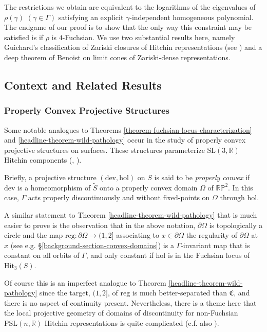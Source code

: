 \documentclass[12pt,a4paper]{amsart}
\theoremstyle{definition}
\theoremstyle{plain}
\numberwithin{equation}{section}
\begin{document}
The restrictions we obtain are equivalent to the logarithms of the eigenvalues of $\rho(\gamma)$ $(\gamma \in \Gamma)$ satisfying an explicit $\gamma$-independent homogeneous polynomial. The endgame of our proof is to show that the only way this constraint may be satisfied is if $\rho$ is $4$-Fuchsian. We use two substantial results here, namely Guichard's classification of Zariski closures of Hitchin representations (see \cite{sambarino2020infinitesimal}) and a deep theorem of Benoist \cite{benoist1997proprietes} on limit cones of Zariski-dense representations.

\subsection{Context and Related Results}

\subsubsection{Properly Convex Projective Structures}\label{history-projective-structures}

Some notable analogues to Theorems \ref{theorem-fuchsian-locus-characterization} and \ref{headline-theorem-wild-pathology} occur in the study of properly convex projective structures on surfaces. These structures parameterize $\text{SL}(3,\mathbb{R})$ Hitchin components (\cite{goldman1990convex}, \cite{choi1993convex}).

Briefly, a projective structure $(\text{dev}, \text{hol})$ on $S$ is said to be \textit{properly convex} if $\text{dev}$ is a homeomorphism of $\widetilde{S}$ onto a properly convex domain $\Omega$ of $\mathbb{RP}^2$. In this case, $\Gamma$ acts properly discontinuously and without fixed-points on $\Omega$ through $\text{hol}$.

A similar statement to Theorem \ref{headline-theorem-wild-pathology} that is much easier to prove is the observation that in the above notation, $\partial \Omega$ is topologically a circle and the map $\text{reg}: \partial \Omega \to (1,2]$ associating to $x \in \partial \Omega$ the regularity of $\partial \Omega$ at $x$ (see e.g. \S\ref{background-section-convex-domains}) is a $\Gamma$-invariant map that is constant on all orbits of $\Gamma$, and only constant if $\text{hol}$ is in the Fuchsian locus of $\text{Hit}_3(S)$.

Of course this is an imperfect analogue to Theorem \ref{headline-theorem-wild-pathology} since the target, $(1,2]$, of $\text{reg}$ is much better-separated than $\mathfrak{C}$, and there is no aspect of continuity present. Nevertheless, there is a theme here that the local projective geometry of domains of discontinuity for non-Fuchsian $\text{PSL}(n,\mathbb{R})$ Hitchin representations is quite complicated (c.f. also \cite{pozzettiSambarino2022lipschitz}).
\end{document}
